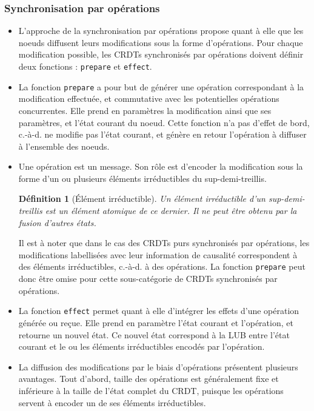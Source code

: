\documentclass[12pt]{thesul}
\newtheorem{definition}{Définition}
\newcommand{\ie}{c.-à-d. }
\begin{document}
\subsubsection{Synchronisation par opérations}

\begin{itemize}
  \item L'approche de la synchronisation par opérations propose quant à elle que les noeuds diffusent leurs modifications sous la forme d'opérations.
    Pour chaque modification possible, les \acp{CRDT} synchronisés par opérations doivent définir deux fonctions : \texttt{prepare} et \texttt{effect}.
  \item La fonction \texttt{prepare} a pour but de générer une opération correspondant à la modification effectuée, et commutative avec les potentielles opérations concurrentes.
    Elle prend en paramètres la modification ainsi que ses paramètres, et l'état courant du noeud.
    Cette fonction n'a pas d'effet de bord, \ie ne modifie pas l'état courant, et génère en retour l'opération à diffuser à l'ensemble des noeuds.
  \item Une opération est un message.
    Son rôle est d'encoder la modification sous la forme d'un ou plusieurs éléments irréductibles du sup-demi-treillis.
    \begin{definition}[Élément irréductible]
      \label{def:irreducible-element}
      Un élément irréductible d'un sup-demi-treillis est un élément atomique de ce dernier.
      Il ne peut être obtenu par la fusion d'autres états.
    \end{definition}
    Il est à noter que dans le cas des \acp{CRDT} purs synchronisés par opérations\cite{baquero2017pure}, les modifications labellisées avec leur information de causalité correspondent à des éléments irréductibles, \ie à des opérations.
    La fonction \texttt{prepare} peut donc être omise pour cette sous-catégorie de \acp{CRDT} synchronisés par opérations.
  \item La fonction \texttt{effect} permet quant à elle d'intégrer les effets d'une opération générée ou reçue.
    Elle prend en paramètre l'état courant et l'opération, et retourne un nouvel état.
    Ce nouvel état correspond à la \ac{LUB} entre l'état courant et le ou les éléments irréductibles encodés par l'opération.
  \item La diffusion des modifications par le biais d'opérations présentent plusieurs avantages.
    Tout d'abord, taille des opérations est généralement fixe et inférieure à la taille de l'état complet du \ac{CRDT}, puisque les opérations servent à encoder un de ses éléments irréductibles.

\end{itemize}
\end{document}
